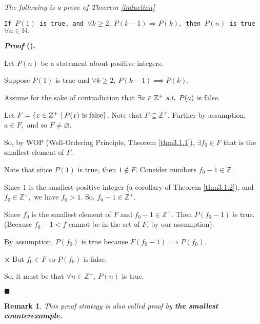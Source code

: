 \documentclass[12pt,a4paper]{article}
\newcounter{nprf}[subsection]
\newtheorem*{rmk}{\indent Remark}
\newenvironment*{prf}{\par\indent\textbf{\textit{Proof} (\stepcounter{nprf}\thenprf). }\par}{\par\hfill $\blacksquare$\par}
\def\Z{{\mathbb{Z}}}
\def\N{{\mathbb{N}}}
\def\Zp{{\Z^{+}}}
\def\emptyset{\varnothing}
\def\st{\emph{ s.t. }}
\begin{document}
\begin{framed}
\noindent\textit{The following is a prove of Theorem \ref{induction}}\par\noindent
\texttt{If $P(1)$ is true, and $\forall k\geq2,\ P(k-1)\Rightarrow P(k),$ then $P(n)$ is true $\forall n\in\N.$}
\begin{prf}
	Let $P(n)$ be a statement about positive integers. \par Suppose $P(1)$ is true and $\forall k\geq2,\ P(k-1)\implies P(k).$\par Assume for the sake of contradiction that $\exists a\in\Zp\st P(a)$ is false. \par Let $F=\qty{x\in\Zp\mid P(x)\text{ is false}}$. Note that $F\subseteq\Zp.$ Further by assumption, $a\in F,$ and so $F\neq\emptyset.$\par So, by WOP (Well-Ordering Principle, Theorem \ref{thm3.1.1}), $\exists f_0\in F$ that is the smallest element of $F$. $\qquad$\big[WTS: $F=\emptyset$\big]\par Note that since $P(1)$ is true, then $1\notin F.$ Consider numbers $f_0-1\in\Z.$\par Since $1$ is the smallest positive integer (a corollary of Theorem \ref{thm3.1.2}), and $f_0\in\Zp,$ we have $f_0>1$. So, $f_0-1\in\Zp.$\par Since $f_0$ is the smallest element of $F$ and $f_0-1\in\Zp.$ Then $P(f_0-1)$ is true. (Because $f_0-1<f$ cannot be in the set of $F$, by our assumption).\par By assumption, $P(f_0)$ is true because $F(f_0-1)\implies P(f_0).$\par\begin{center}$\divideontimes$ But $f_0\in F$ so $P(f_0)$ is false. \end{center}\par So, it must be that $\forall n\in\Zp,\ P(n)$ is true. 
\end{prf}
\begin{rmk} This proof strategy is also called proof by \textbf{the smallest counterexample. }\end{rmk}
\end{framed}
\end{document}
